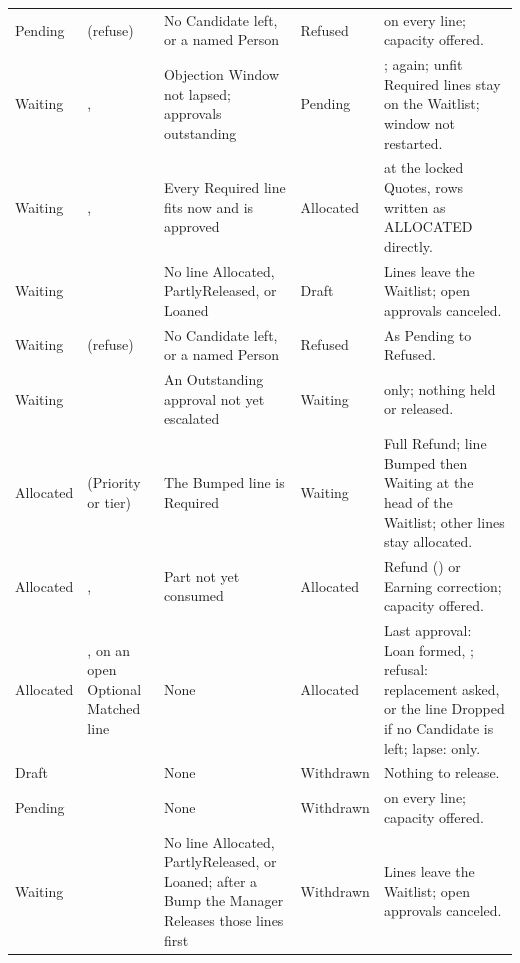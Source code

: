 {\begin{longtable}{@{}L{0.09\textwidth}L{0.21\textwidth}L{0.19\textwidth}L{0.09\textwidth}L{0.34\textwidth}@{}}
Pending &  (refuse) & No Candidate left, or a named Person & Refused &  on every line; capacity offered. \\
Waiting & ,  & Objection Window not lapsed; approvals outstanding & Pending & ;  again; unfit Required lines stay on the Waitlist; window not restarted. \\
Waiting & ,  & Every Required line fits now and is approved & Allocated &  at the locked Quotes, rows written as ALLOCATED directly. \\
Waiting &  & No line Allocated, PartlyReleased, or Loaned & Draft & Lines leave the Waitlist; open approvals canceled. \\
Waiting &  (refuse) & No Candidate left, or a named Person & Refused & As Pending to Refused. \\
Waiting &  & An Outstanding approval not yet escalated & Waiting &  only; nothing held or released. \\
Allocated &  (Priority or tier) & The Bumped line is Required & Waiting & Full Refund; line Bumped then Waiting at the head of the Waitlist; other lines stay allocated. \\
Allocated & ,  & Part not yet consumed & Allocated & Refund () or Earning correction; capacity offered. \\
Allocated & ,  on an open Optional Matched line & None & Allocated & Last approval: Loan formed, ; refusal: replacement asked, or the line Dropped if no Candidate is left; lapse:  only. \\
Draft &  & None & Withdrawn & Nothing to release. \\
Pending &  & None & Withdrawn &  on every line; capacity offered. \\
Waiting &  & No line Allocated, PartlyReleased, or Loaned; after a Bump the Manager Releases those lines first & Withdrawn & Lines leave the Waitlist; open approvals canceled. \\
\end{longtable}}

